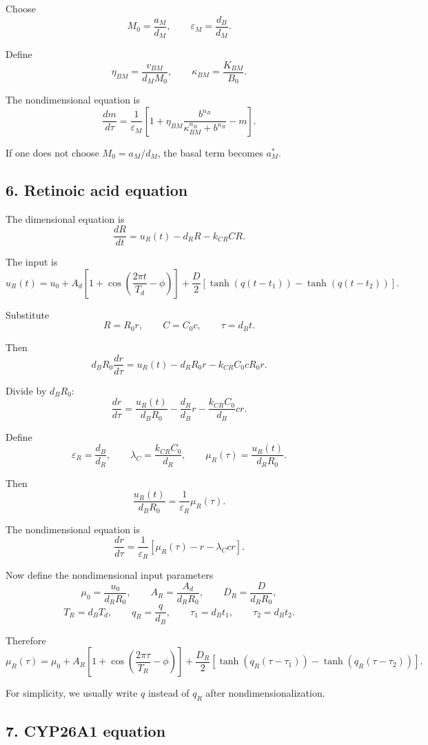 \documentclass[11pt]{article}
\begin{document}
Choose
\[
M_0=\frac{a_M}{d_M},
\qquad
\varepsilon_M=\frac{d_B}{d_M}.
\]

Define
\[
\eta_{BM}=\frac{v_{BM}}{d_MM_0},
\qquad
\kappa_{BM}=\frac{K_{BM}}{B_0}.
\]

The nondimensional equation is
\[
\boxed{
\frac{dm}{d\tau}
=
\frac{1}{\varepsilon_M}
\left[
1
+
\eta_{BM}
\frac{b^{n_B}}
{\kappa_{BM}^{n_B}+b^{n_B}}
-
m
\right].
}
\]

If one does not choose \(M_0=a_M/d_M\), the basal term becomes \(a_M^*\).

\subsection{6. Retinoic acid equation}

The dimensional equation is
\[
\frac{dR}{dt}
=
u_R(t)
-
d_RR
-
k_{CR}CR.
\]

The input is
\[
u_R(t)
=
u_0
+
A_d
\left[
1+
\cos\left(
\frac{2\pi t}{T_d}-\phi
\right)
\right]
+
\frac{D}{2}
\left[
\tanh(q(t-t_1))
-
\tanh(q(t-t_2))
\right].
\]

Substitute
\[
R=R_0r,\qquad C=C_0c,\qquad \tau=d_Bt.
\]

Then
\[
d_BR_0\frac{dr}{d\tau}
=
u_R(t)
-
d_RR_0r
-
k_{CR}C_0cR_0r.
\]

Divide by \(d_BR_0\):
\[
\frac{dr}{d\tau}
=
\frac{u_R(t)}{d_BR_0}
-
\frac{d_R}{d_B}r
-
\frac{k_{CR}C_0}{d_B}cr.
\]

Define
\[
\varepsilon_R=\frac{d_B}{d_R},
\qquad
\lambda_C=\frac{k_{CR}C_0}{d_R},
\qquad
\mu_R(\tau)=\frac{u_R(t)}{d_RR_0}.
\]

Then
\[
\frac{u_R(t)}{d_BR_0}
=
\frac{1}{\varepsilon_R}\mu_R(\tau).
\]

The nondimensional equation is
\[
\boxed{
\frac{dr}{d\tau}
=
\frac{1}{\varepsilon_R}
\left[
\mu_R(\tau)
-
r
-
\lambda_Ccr
\right].
}
\]

Now define the nondimensional input parameters
\[
\mu_0=\frac{u_0}{d_RR_0},
\qquad
A_R=\frac{A_d}{d_RR_0},
\qquad
D_R=\frac{D}{d_RR_0},
\]
\[
T_R=d_BT_d,
\qquad
q_R=\frac{q}{d_B},
\qquad
\tau_1=d_Bt_1,
\qquad
\tau_2=d_Bt_2.
\]

Therefore
\[
\boxed{
\mu_R(\tau)
=
\mu_0
+
A_R
\left[
1+
\cos\left(
\frac{2\pi \tau}{T_R}-\phi
\right)
\right]
+
\frac{D_R}{2}
\left[
\tanh(q_R(\tau-\tau_1))
-
\tanh(q_R(\tau-\tau_2))
\right].
}
\]

For simplicity, we usually write \(q\) instead of \(q_R\) after nondimensionalization.

\subsection{7. CYP26A1 equation}
\end{document}
